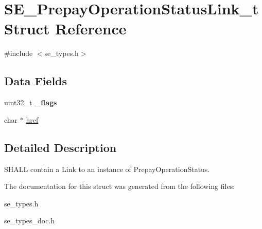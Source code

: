 \hypertarget{structSE__PrepayOperationStatusLink__t}{}\section{S\+E\+\_\+\+Prepay\+Operation\+Status\+Link\+\_\+t Struct Reference}
\label{structSE__PrepayOperationStatusLink__t}


{\ttfamily \#include $<$se\+\_\+types.\+h$>$}

\subsection*{Data Fields}
\begin{DoxyCompactItemize}
\item 
uint32\+\_\+t {\bfseries \+\_\+flags}
\item 
char $\ast$ \hyperlink{group__PrepayOperationStatusLink_ga1945ecb56144d5d0b8db86b56dc485e8}{href}
\end{DoxyCompactItemize}


\subsection{Detailed Description}
S\+H\+A\+LL contain a Link to an instance of Prepay\+Operation\+Status. 

The documentation for this struct was generated from the following files\+:\begin{DoxyCompactItemize}
\item 
se\+\_\+types.\+h\item 
se\+\_\+types\+\_\+doc.\+h\end{DoxyCompactItemize}
